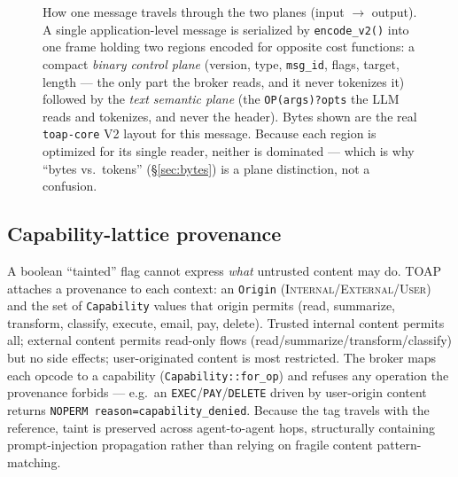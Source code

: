 \documentclass[11pt]{article}
\begin{document}
\begin{figure}[h]
\caption{How one message travels through the two planes (input $\to$ output). A single application-level
message is serialized by \texttt{encode\_v2()} into one frame holding two regions encoded for opposite
cost functions: a compact \emph{binary control plane} (version, type, \texttt{msg\_id}, flags, target,
length --- the only part the broker reads, and it never tokenizes it) followed by the \emph{text
semantic plane} (the \texttt{OP(args)?opts} the LLM reads and tokenizes, and never the header). Bytes
shown are the real \texttt{toap-core} V2 layout for this message. Because each region is optimized for
its single reader, neither is dominated --- which is why ``bytes vs.\ tokens'' (\S\ref{sec:bytes}) is a
plane distinction, not a confusion.}
\label{fig:twoplane}
\end{figure}

\subsection{Capability-lattice provenance}\label{sec:arch:security:cap}
A boolean ``tainted'' flag cannot express \emph{what} untrusted content may do. TOAP attaches a
provenance to each context: an \texttt{Origin} (\textsc{Internal}/\textsc{External}/\textsc{User}) and
the set of \texttt{Capability} values that origin permits (read, summarize, transform, classify,
execute, email, pay, delete). Trusted internal content permits all; external content permits read-only
flows (read/summarize/transform/classify) but no side effects; user-originated content is most
restricted. The broker maps each opcode to a capability (\texttt{Capability::for\_op}) and refuses any
operation the provenance forbids --- e.g.\ an \texttt{EXEC}/\texttt{PAY}/\texttt{DELETE} driven by
user-origin content returns \texttt{NOPERM reason=capability\_denied}. Because the tag travels with the
reference, taint is preserved across agent-to-agent hops, structurally containing prompt-injection
propagation rather than relying on fragile content pattern-matching.
\end{document}
